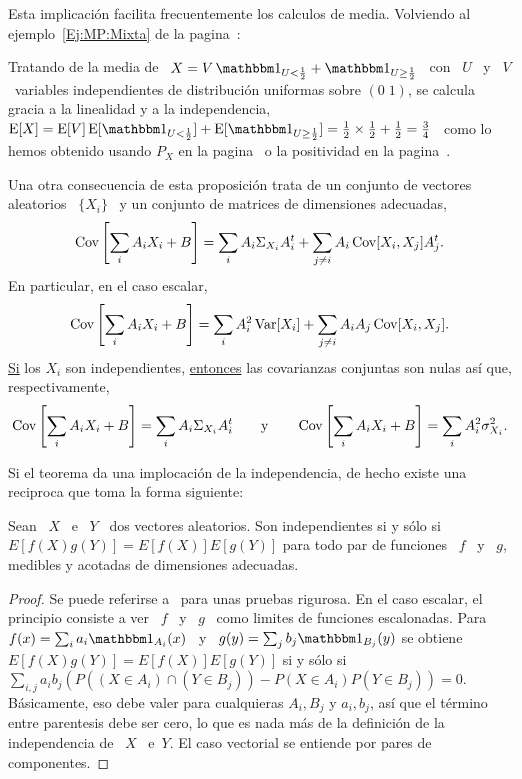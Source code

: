 Esta implicaci\'on facilita frecuentemente  los calculos de media.  Volviendo al
ejemplo~\ref{Ej:MP:Mixta}  de la  pagina~\pageref{Ej:MP:Mixta}:
%
\begin{ejemplo}
\label{Ej:EspMixtaInd}
%
Tratando de la media  de \ $X = V \, \un_{U < \frac12}  + \un_{U \ge \frac12}$ \
con \ $U$ \ y \ $V$ \ variables independientes de distribuci\'on uniformas sobre
$(0 \; 1)$, se calcula gracia a la linealidad y a la independencia, \ $\Esp[X] =
\Esp[V] \Esp[\un_{U  < \frac12}]  + \Esp[\un_{U \ge  \frac12}] =  \frac12 \times
\frac12  + \frac12  =  \frac34$ \  como lo  hemos  obtenido usando  $P_X$ en  la
pagina~\pageref{Ej:MP:EspMixta}      o       la      positividad      en      la
pagina~\pageref{Ej:MP:EspMixtaPositiva}.
\end{ejemplo}

Una otra  consecuencia de  esta proposici\'on trata  de un conjunto  de vectores
aleatorios \ $\{ X_i \}$ \ y un conjunto de matrices de dimensiones adecuadas,
%
\[
\operatorname{Cov}\left[ \sum_i A_i X_i + B\right] =  \sum_i A_i \Sigma_{X_i} A_i^t + \sum_{j \ne
  i} A_i \operatorname{Cov}[X_i,X_j] A_j^t.
\]
%
En particular, en el caso escalar,
%
\[
\operatorname{Cov}\left[ \sum_i A_i X_i + B \right]  = \sum_i A_i^2 \operatorname{Var}[X_i] + \sum_{j \ne i}
A_i A_j \operatorname{Cov}[X_i,X_j].
\]
%
\underline{Si}   los   $X_i$   son  independientes,   \underline{entonces}   las
covarianzas conjuntas son nulas as\'i que, respectivamente,
\[
\operatorname{Cov}\left[ \sum_i  A_i X_i +  B \right] =  \sum_i A_i \Sigma_{X_i}  A_i^t \qquad
\mbox{y}  \qquad  \operatorname{Cov}\left[  \sum_i  A_i   X_i  +  B  \right]  =  \sum_i  A_i^2
\sigma_{X_i}^2.
\]

Si el  teorema da  una implocaci\'on  de la independencia,  de hecho  existe una
reciproca que toma la forma siguiente:
%
\begin{teorema}
\label{Teo:MP:IndependenciaMomentos}
%
  Sean \ $X$ \ e \ $Y$ \ dos vectores aleatorios. Son independientes si y s\'olo
  si $E[f(X) g(Y)]=E[f(X)] E[g(Y)]$ para todo par  de funciones \ $f$ \ y \ $g$,
  medibles y acotadas de dimensiones adecuadas.
\end{teorema}
%
\begin{proof}
  Se puede referirse a~\cite{Fel71, JacPro03} para unas pruebas rigurosa.  En el
  caso escalar, el  principio consiste a ver \  $f$ \ y \ $g$ \  como limites de
  funciones escalonadas. Para  \ $f(x) = \sum_i a_i \un_{A_i}(x)$ \  y \ $g(y) =
  \sum_j b_j \un_{B_j}(y)$ se obtiene $E[f(X) g(Y)]=E[f(X)] E[g(Y)]$ si y s\'olo
  si $\sum_{i,j} a_i b_j \left( P( (X \in  A_i) \cap (Y \in B_j)) - P(X \in A_i)
    P(Y \in  B_j) \right) = 0$.  B\'asicamente, eso debe  valer para cualquieras
  $A_i, B_j$  y $a_i,  b_j$, as\'i  que el t\'ermino  entre parentesis  debe ser
  cero, lo que es  nada m\'as de la definici\'on de la  independencia de \ $X$ \
  e\ $Y$.  El caso vectorial se entiende por pares de componentes.
\end{proof}

